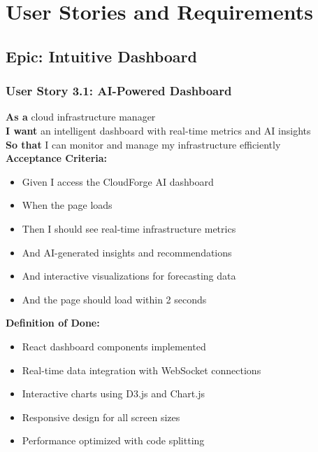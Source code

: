 \section{User Stories and Requirements}

\subsection{Epic: Intuitive Dashboard}

\subsubsection{User Story 3.1: AI-Powered Dashboard}

\begin{tcolorbox}[colback=lightgray, colframe=primaryblue, title=US-3.1: AI-Powered Dashboard]
\textbf{As a} cloud infrastructure manager \\
\textbf{I want} an intelligent dashboard with real-time metrics and AI insights \\
\textbf{So that} I can monitor and manage my infrastructure efficiently \\

\textbf{Acceptance Criteria:}
\begin{itemize}
    \item Given I access the CloudForge AI dashboard
    \item When the page loads
    \item Then I should see real-time infrastructure metrics
    \item And AI-generated insights and recommendations
    \item And interactive visualizations for forecasting data
    \item And the page should load within 2 seconds
\end{itemize}

\textbf{Definition of Done:}
\begin{itemize}
    \item React dashboard components implemented
    \item Real-time data integration with WebSocket connections
    \item Interactive charts using D3.js and Chart.js
    \item Responsive design for all screen sizes
    \item Performance optimized with code splitting
\end{itemize}
\end{tcolorbox}

